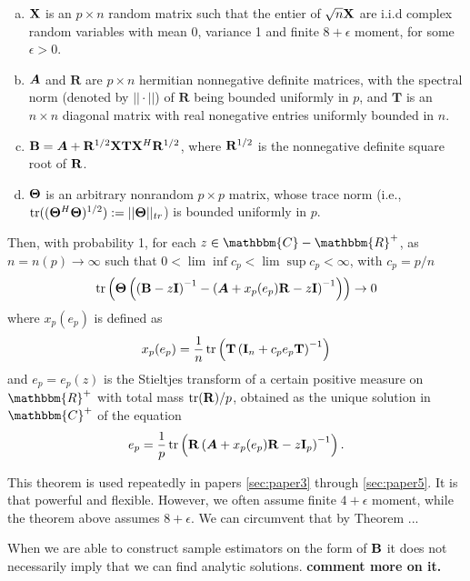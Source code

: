 \documentclass[oneside]{book}\usepackage{knitr}
\begin{document}
\begin{theorem}
\begin{enumerate}[(a)]
  \item $\mathbf{X}$ is an $p \times n$ random matrix such that the entier of $\sqrt{n}\mathbf{X}$ are i.i.d complex random variables with mean 0, variance 1 and finite $8+\epsilon$ moment, for some $\epsilon > 0$.
  \item $\mbox{\boldmath$A$}$ and $\mathbf{R}$ are $p \times n$ hermitian nonnegative definite matrices, with the spectral norm (denoted by $||\cdot||$) of $\mathbf{R}$ being bounded uniformly in $p$, and $\mathbf{T}$ is an $n \times n$ diagonal matrix with real nonegative entries  uniformly bounded in $n$.
  \item $\mathbf{B}=\mbox{\boldmath$A$} + \mathbf{R}^{1/2} \mathbf{X} \mathbf{T} \mathbf{X}^H \mathbf{R}^{1/2}$, where $\mathbf{R}^{1/2}$ is the nonnegative definite square root of $\mathbf{R}$.
  \item $\mathbf{\Theta}$ is an arbitrary nonrandom $p \times p$ matrix, whose trace norm (i.e., $\operatorname{tr}((\mathbf{\Theta}^H \mathbf{\Theta})^{1/2}):=||\mathbf{\Theta}||_{tr}$) is bounded uniformly in $p$.
\end{enumerate}
Then, with probability 1, for each $z\in \mathbbm{C}-\mathbbm{R}^+$, as $n=n(p) \rightarrow \infty$ such that $0<\lim\inf c_p<\lim \sup c_p < \infty$, with $c_p = p/n$
\begin{equation}
  \operatorname{tr}\left(\mathbf{\Theta}\left( \left(\mathbf{B} - z\mathbf{I}\right)^{-1} - \left( \mbox{\boldmath$A$} + x_p(e_p)\mathbf{R} - z\mathbf{I} \right)^{-1} \right) \right) \rightarrow 0
\end{equation}
where $x_p(e_p)$ is defined as
\begin{equation}
  x_p(e_p) = \frac{1}{n}\operatorname{tr} \left( \mathbf{T} \left(\mathbf{I}_n + c_p e_p \mathbf{T} \right)^{-1} \right)
\end{equation}
and $e_p=e_p(z)$ is the Stieltjes transform of a certain positive measure on $\mathbbm{R}^+$ with total mass $\operatorname{tr}(\mathbf{R})/p$, obtained as the unique solution in $\mathbbm{C}^+$ of the equation
\begin{equation}
  e_p = \frac{1}{p}\operatorname{tr} \left( \mathbf{R} \left(\mbox{\boldmath$A$} +  x_p(e_p) \mathbf{R} - z\mathbf{I}_p \right)^{-1} \right).
\end{equation}
\end{theorem}
This theorem is used repeatedly in papers \ref{sec:paper3} through \ref{sec:paper5}. It is that powerful and flexible. However, we often assume finite $4+\epsilon$ moment, while the theorem above assumes $8+\epsilon$. We can circumvent that by Theorem \citet{REF}... 

When we are able to construct sample estimators on the form of $\mathbf{B}$ it does not necessarily imply that we can find analytic solutions. \textbf{comment more on it.}
\end{document}
